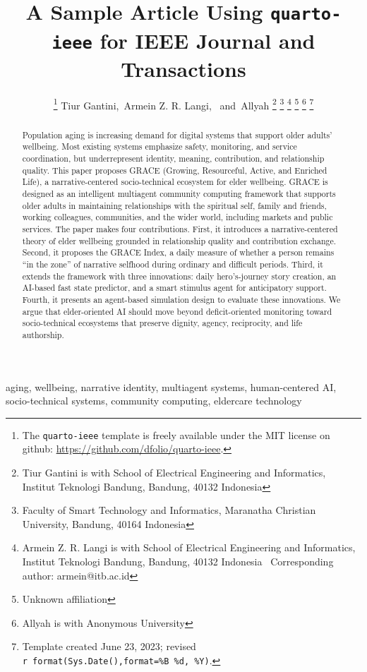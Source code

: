 \documentclass[
  journal,
]{IEEEtran}%
\title{A Sample Article Using \texttt{quarto-ieee} for IEEE Journal and
Transactions}
\author{
\thanks{The \texttt{quarto-ieee} template is freely available under the
MIT license on github: \url{https://github.com/dfolio/quarto-ieee}.}
Tiur Gantini,~Armein Z. R.
Langi\orcidlink{0000-0001-9430-6091},~\IEEEmembership{Senior Member,
IEEE}
and~Allyah%
\thanks{Tiur Gantini is with School of Electrical Engineering and
Informatics, Institut Teknologi Bandung, Bandung, 40132 Indonesia%
}
\thanks{Faculty of Smart Technology and Informatics, Maranatha Christian
University, Bandung, 40164 Indonesia}
\thanks{Armein Z. R. Langi is with School of Electrical Engineering and
Informatics, Institut Teknologi Bandung, Bandung, 40132 Indonesia%
  Corresponding author: armein@itb.ac.id
}
\thanks{Unknown affiliation}
\thanks{Allyah is with Anonymous University%
}
\thanks{Template created June 23, 2023; revised
\texttt{r\ format(Sys.Date(),format=\textquotesingle{}\%B\ \%d,\ \%Y\textquotesingle{})}.}
}
\begin{document}


\maketitle

\begin{abstract}
Population aging is increasing demand for digital systems that support
older adults' wellbeing. Most existing systems emphasize safety,
monitoring, and service coordination, but underrepresent identity,
meaning, contribution, and relationship quality. This paper proposes
GRACE (Growing, Resourceful, Active, and Enriched Life), a
narrative-centered socio-technical ecosystem for elder wellbeing. GRACE
is designed as an intelligent multiagent community computing framework
that supports older adults in maintaining relationships with the
spiritual self, family and friends, working colleagues, communities, and
the wider world, including markets and public services. The paper makes
four contributions. First, it introduces a narrative-centered theory of
elder wellbeing grounded in relationship quality and contribution
exchange. Second, it proposes the GRACE Index, a daily measure of
whether a person remains ``in the zone'' of narrative selfhood during
ordinary and difficult periods. Third, it extends the framework with
three innovations: daily hero's-journey story creation, an AI-based fast
state predictor, and a smart stimulus agent for anticipatory support.
Fourth, it presents an agent-based simulation design to evaluate these
innovations. We argue that elder-oriented AI should move beyond
deficit-oriented monitoring toward socio-technical ecosystems that
preserve dignity, agency, reciprocity, and life authorship.
\end{abstract}
\begin{IEEEkeywords}
aging, wellbeing, narrative identity, multiagent systems, human-centered
AI, socio-technical systems, community computing, eldercare technology
\end{IEEEkeywords}

%
\end{document}
